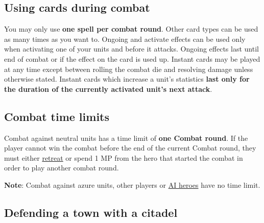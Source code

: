 \subsection*{\hypertarget{CombatCards}{Using cards during combat}}
You may only use \textbf{one spell per combat round}.
Other card types can be used as many times as you want to.
Ongoing  and  activate effects can be used only when activating one of your units and before it attacks.
Ongoing effects last until end of combat or if the effect on the card is used up.
Instant  cards may be played at any time except between rolling the combat die and resolving damage unless otherwise stated.
Instant cards which increase a unit's statistics \textbf{last only for the duration of the currently activated unit's next attack}.
\subsection*{\hypertarget{Timelimit}{Combat time limits}}
Combat against neutral units has a time limit of \textbf{one Combat round}.
If the player cannot win the combat before the end of the current Combat round, they must either \hyperlink{Endcombat}{retreat} or spend 1 MP from the hero that started the combat in order to play another combat round.\par
\textbf{Note}: Combat against azure  units, other players or \hyperlink{AIrules}{AI heroes} have no time limit.
\clearpage
\subsection*{\hypertarget{Walls}{Defending a town with a citadel}}

